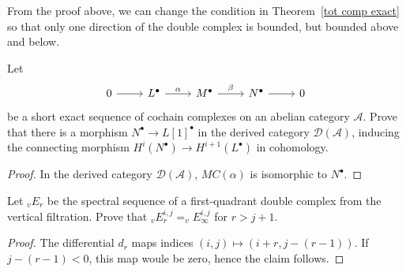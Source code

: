 \begin{remark}
From the proof above, we can change the condition in Theorem~\ref{tot comp exact} so that only one direction of the double complex is bounded, but bounded above and below.
\end{remark}
\begin{exercise}
Let
\[\begin{tikzcd}
0\ar[r]&L^\bullet\ar[r,"\alpha"]&M^\bullet\ar[r,"\beta"]&N^\bullet\ar[r]&0
\end{tikzcd}\]
be a short exact sequence of cochain complexes on an abelian category $\mathcal{A}$. Prove that there is a morphism $N^\bullet\to L[1]^\bullet$ in the derived category $\mathcal{D}(\mathcal{A})$, inducing the connecting morphism $H^i(N^\bullet)\to H^{i+1}(L^\bullet)$ in cohomology.
\end{exercise}
\begin{proof}
In the derived category $\mathcal{D}(\mathcal{A})$, $MC(\alpha)$ is isomorphic to $N^\bullet$.
\end{proof}
\begin{exercise}
Let $_{v}E_r$ be the spectral sequence of a first-quadrant double complex from the vertical filtration. Prove that $_{v}E^{i,j}_r=_{v}E^{i,j}_\infty$ for $r>j+1$.
\end{exercise}
\begin{proof}
The differential $d_r$ maps indices $(i,j)\mapsto(i+r,j-(r-1))$. If $j-(r-1)<0$, this map woule be zero, hence the claim follows.
\end{proof}
